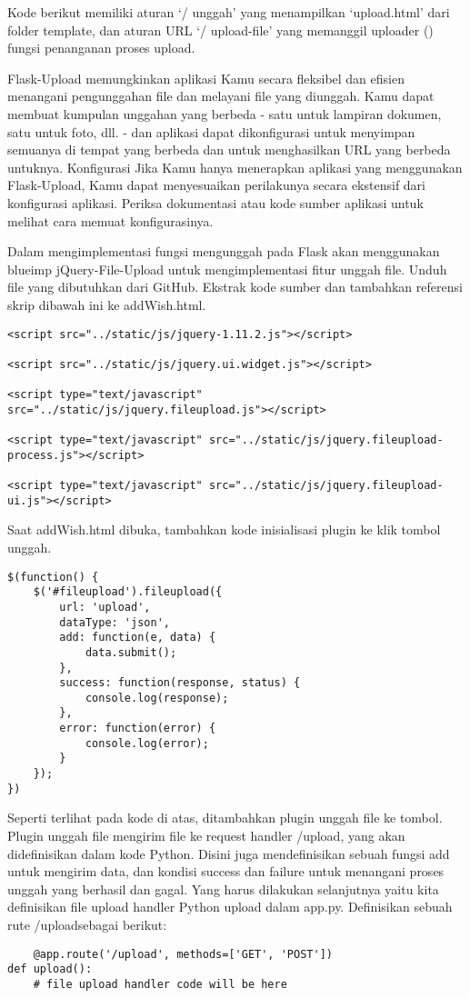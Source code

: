 \documentclass[12pt,a4paper]{article}
\begin{document}
Kode berikut memiliki aturan ‘/ unggah’ yang menampilkan ‘upload.html’ dari folder template, dan aturan URL ‘/ upload-file’ yang memanggil uploader () fungsi penanganan proses upload.

Flask-Upload memungkinkan aplikasi Kamu secara fleksibel dan efisien menangani pengunggahan file dan melayani file yang diunggah. Kamu dapat membuat kumpulan unggahan yang berbeda - satu untuk lampiran dokumen, satu untuk foto, dll. - dan aplikasi dapat dikonfigurasi untuk menyimpan semuanya di tempat yang berbeda dan untuk menghasilkan URL yang berbeda untuknya.
Konfigurasi
Jika Kamu hanya menerapkan aplikasi yang menggunakan Flask-Upload, Kamu dapat menyesuaikan perilakunya secara ekstensif dari konfigurasi aplikasi. Periksa dokumentasi atau kode sumber aplikasi untuk melihat cara memuat konfigurasinya.


Dalam mengimplementasi fungsi mengunggah pada Flask akan menggunakan blueimp jQuery-File-Upload untuk mengimplementasi fitur unggah file. Unduh file yang dibutuhkan dari GitHub. Ekstrak kode sumber dan tambahkan referensi skrip dibawah ini ke addWish.html.
\begin{verbatim}
<script src="../static/js/jquery-1.11.2.js"></script>
 
<script src="../static/js/jquery.ui.widget.js"></script>
 
<script type="text/javascript" src="../static/js/jquery.fileupload.js"></script>
 
<script type="text/javascript" src="../static/js/jquery.fileupload-process.js"></script>
 
<script type="text/javascript" src="../static/js/jquery.fileupload-ui.js"></script>
\end{verbatim}

Saat addWish.html dibuka, tambahkan kode inisialisasi plugin ke klik tombol unggah.

\begin{verbatim}
$(function() {
    $('#fileupload').fileupload({
        url: 'upload',
        dataType: 'json',
        add: function(e, data) {
            data.submit();
        },
        success: function(response, status) {
            console.log(response);
        },
        error: function(error) {
            console.log(error);
        }
    });
})
\end{verbatim}
Seperti terlihat pada kode di atas, ditambahkan plugin unggah file ke tombol. Plugin unggah file mengirim file ke request handler /upload, yang akan didefinisikan dalam kode Python. Disini juga mendefinisikan sebuah fungsi add untuk mengirim data, dan kondisi success dan failure untuk menangani proses unggah yang berhasil dan gagal.
Yang harus dilakukan selanjutnya yaitu kita definisikan file upload handler Python upload dalam app.py. Definisikan sebuah rute /uploadsebagai berikut:
\begin{verbatim}
	@app.route('/upload', methods=['GET', 'POST'])
def upload():
    # file upload handler code will be here
    
\end{verbatim}
    
\end{document}
